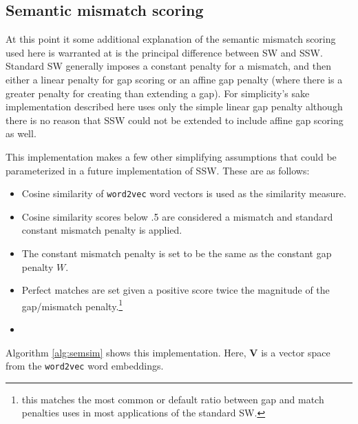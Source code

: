 \subsection{Semantic mismatch scoring}
At this point it some additional explanation of the semantic mismatch scoring used here is warranted at is the principal difference between SW and SSW. Standard SW generally imposes a constant penalty for a mismatch, and then either a linear penalty for gap scoring or an affine gap penalty (where there is a greater penalty for creating than extending a gap). For simplicity's sake implementation described here uses only the simple linear gap penalty although there is no reason that SSW could not be extended to include affine gap scoring as well.

This implementation makes a few other simplifying assumptions that could be parameterized in a future implementation of SSW. These are as follows:

\begin{itemize}
\item Cosine similarity of \texttt{word2vec} word vectors is used as the similarity measure.
\item Cosine similarity scores below .5 are considered a mismatch and standard constant mismatch penalty is applied.
\item The constant mismatch penalty is set to be the same as the constant gap penalty $W$.
\item Perfect matches are set given a positive score twice the magnitude of the gap/mismatch penalty.\footnote{this matches the most common or default ratio between gap and match penalties uses in most applications of the standard SW.}
\item
\end{itemize}
  
Algorithm \ref{alg:semsim} shows this implementation. Here, $\mathbf{V}$ is a vector space from the \texttt{word2vec} word embeddings. 

\begin{algorithm}[t]
\SetAlgoNoLine
{}
\caption{Semantically Weighted Alignment Score}
\label{alg:semsim}
\end{algorithm}


